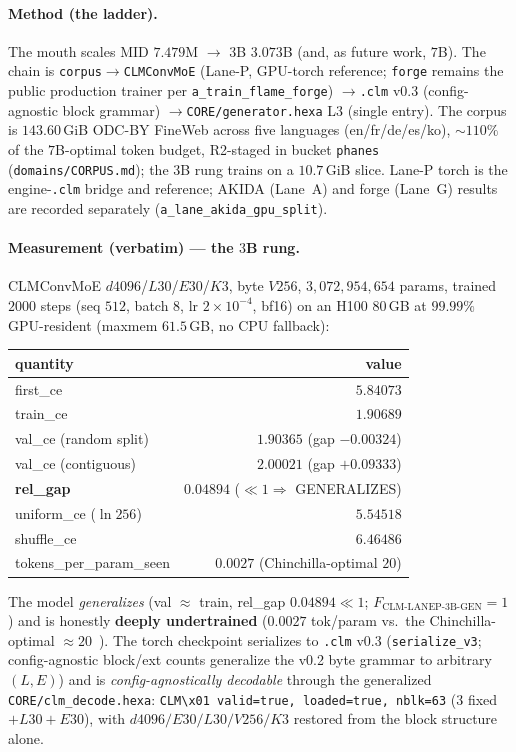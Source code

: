 \documentclass[11pt]{article}
\begin{document}
\paragraph{Method (the ladder).} The mouth scales MID $7.479$M $\rightarrow$ $3$B
$3.073$B (and, as future work, $7$B). The chain is
\texttt{corpus}$\rightarrow$\texttt{CLMConvMoE} (Lane-P, GPU-torch reference;
\texttt{forge} remains the public production trainer per \texttt{a\_train\_flame\_forge})
$\rightarrow$\texttt{.clm} v0.3 (config-agnostic block grammar)
$\rightarrow$\texttt{CORE/generator.hexa} L3 (single entry). The corpus is
$143.60$\,GiB ODC-BY FineWeb across five languages (en/fr/de/es/ko), $\sim$$110\%$ of
the $7$B-optimal token budget, R2-staged in bucket \texttt{phanes}
(\texttt{domains/CORPUS.md}); the $3$B rung trains on a $10.7$\,GiB slice. Lane-P torch
is the engine-\texttt{.clm} bridge and reference; AKIDA (Lane~A) and forge (Lane~G)
results are recorded separately (\texttt{a\_lane\_akida\_gpu\_split}).

\paragraph{Measurement (verbatim) --- the $3$B rung.} CLMConvMoE
$d4096$/$L30$/$E30$/$K3$, byte $V256$, $3{,}072{,}954{,}654$ params, trained $2000$
steps (seq $512$, batch $8$, lr $2\!\times\!10^{-4}$, bf16) on an H100 80\,GB at
$99.99\%$ GPU-resident (maxmem $61.5$\,GB, no CPU fallback):
\begin{center}
\begin{tabular}{lr}
\toprule
quantity & value \\
\midrule
first\_ce & $5.84073$ \\
train\_ce & $1.90689$ \\
val\_ce (random split) & $1.90365$ \quad (gap $-0.00324$) \\
val\_ce (contiguous) & $2.00021$ \quad (gap $+0.09333$) \\
\textbf{rel\_gap} & $\mathbf{0.04894}$ \quad ($\ll1\Rightarrow$ GENERALIZES) \\
uniform\_ce ($\ln256$) & $5.54518$ \\
shuffle\_ce & $6.46486$ \\
tokens\_per\_param\_seen & $0.0027$ \quad (Chinchilla-optimal $20$) \\
\bottomrule
\end{tabular}
\end{center}
The model \emph{generalizes} (val $\approx$ train, rel\_gap $0.04894\ll1$;
$F_\text{CLM-LANEP-3B-GEN}=1$) and is honestly \textbf{deeply undertrained}
($0.0027$ tok/param vs.\ the Chinchilla-optimal $\approx20$~\cite{hoffmann2022chinchilla}). The torch checkpoint serializes to \texttt{.clm} v0.3
(\texttt{serialize\_v3}; config-agnostic block/ext counts generalize the v0.2 byte
grammar to arbitrary $(L,E)$) and is \emph{config-agnostically decodable} through the
generalized \texttt{CORE/clm\_decode.hexa}: \texttt{CLM\textbackslash x01 valid=true,
loaded=true, nblk=63} ($3$ fixed $+L30+E30$), with $d4096/E30/L30/V256/K3$ restored
from the block structure alone.
\end{document}
